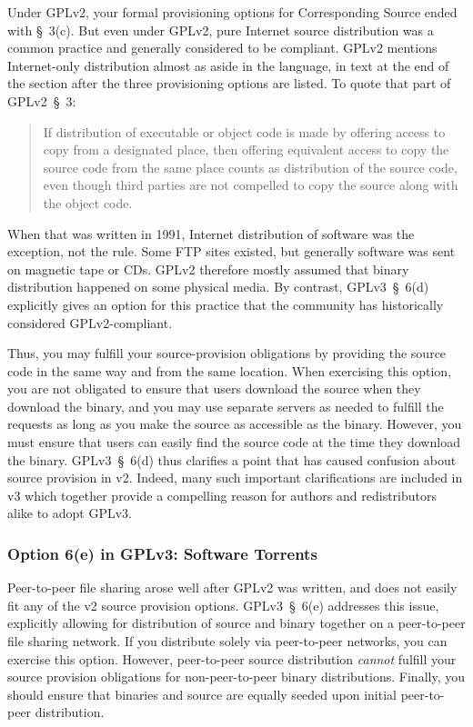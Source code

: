 \documentclass[letterpaper]{fixme}
\begin{document}
Under GPLv2, your formal provisioning options for Corresponding Source
ended with \S~3(c).  But even under GPLv2, pure Internet source
distribution was a common practice and generally considered to be
compliant.  GPLv2 mentions Internet-only distribution almost as aside in
the language, in text at the end of the section after the three
provisioning options are listed.  To quote that part of GPLv2~\S~3:
\begin{quote}
If distribution of executable or object code is made by offering access to
copy from a designated place, then offering equivalent access to copy the
source code from the same place counts as distribution of the source code,
even though third parties are not compelled to copy the source along with
the object code.
\end{quote}

When that was written in 1991, Internet distribution of software was the
exception, not the rule.  Some FTP sites existed, but generally software
was sent on magnetic tape or CDs.  GPLv2 therefore mostly assumed that
binary distribution happened on some physical media.  By contrast,
GPLv3~\S~6(d) explicitly gives an option for this practice that the
community has historically considered GPLv2-compliant.

Thus, you may fulfill your source-provision obligations by providing the
source code in the same way and from the same location.  When exercising
this option, you are not obligated to ensure that users download the
source when they download the binary, and you may use separate servers as
needed to fulfill the requests as long as you make the source as
accessible as the binary.  However, you must ensure that users can easily
find the source code at the time they download the binary. GPLv3~\S~6(d)
thus clarifies a point that has caused confusion about source provision in
v2.  Indeed, many such important clarifications are included in v3 which
together provide a compelling reason for authors and redistributors alike
to adopt GPLv3.

\subsubsection{Option 6(e) in GPLv3: Software Torrents}

Peer-to-peer file sharing arose well after GPLv2 was written, and does not
easily fit any of the v2 source provision options.  GPLv3~\S~6(e)
addresses this issue, explicitly allowing for distribution of source and
binary together on a peer-to-peer file sharing network.  If you distribute
solely via peer-to-peer networks, you can exercise this option.  However,
peer-to-peer source distribution \emph{cannot} fulfill your source
provision obligations for non-peer-to-peer binary distributions.  Finally,
you should ensure that binaries and source are equally seeded upon initial
peer-to-peer distribution.
\end{document}
